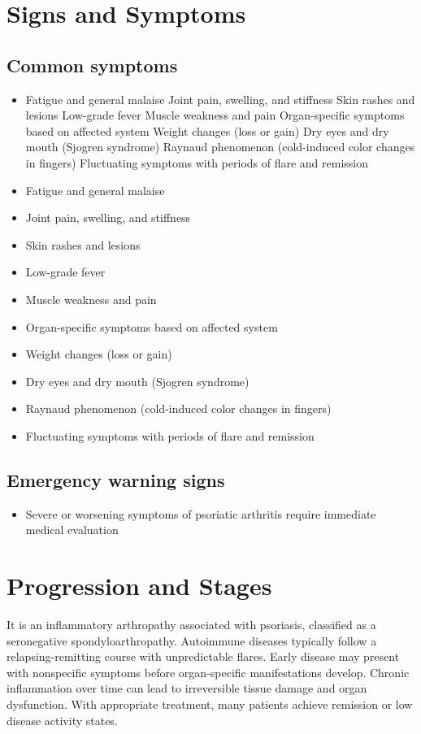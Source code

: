 \section{Signs and Symptoms}

\subsection{Common symptoms}
\begin{itemize}[noitemsep]
  \item Fatigue and general malaise Joint pain, swelling, and stiffness Skin rashes and lesions Low-grade fever Muscle weakness and pain Organ-specific symptoms based on affected system Weight changes (loss or gain) Dry eyes and dry mouth (Sjogren syndrome) Raynaud phenomenon (cold-induced color changes in fingers) Fluctuating symptoms with periods of flare and remission
  \item Fatigue and general malaise
  \item Joint pain, swelling, and stiffness
  \item Skin rashes and lesions
  \item Low-grade fever
  \item Muscle weakness and pain
  \item Organ-specific symptoms based on affected system
  \item Weight changes (loss or gain)
  \item Dry eyes and dry mouth (Sjogren syndrome)
  \item Raynaud phenomenon (cold-induced color changes in fingers)
  \item Fluctuating symptoms with periods of flare and remission
\end{itemize}

\subsection{Emergency warning signs}
\begin{itemize}[noitemsep]
  \item Severe or worsening symptoms of psoriatic arthritis require immediate medical evaluation
\end{itemize}
\section{Progression and Stages}
It is an inflammatory arthropathy associated with psoriasis, classified as a seronegative spondyloarthropathy. Autoimmune diseases typically follow a relapsing-remitting course with unpredictable flares. Early disease may present with nonspecific symptoms before organ-specific manifestations develop. Chronic inflammation over time can lead to irreversible tissue damage and organ dysfunction. With appropriate treatment, many patients achieve remission or low disease activity states.
